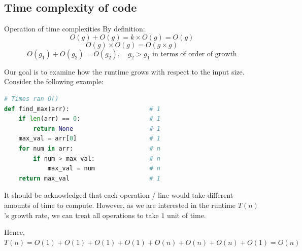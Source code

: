 \subsection{Time complexity of code}

\begin{knBox}
    {Operation of time complexities}
    By definition:
    \[O(g)+O(g)=k\times O(g)=O(g)\]
    \[O(g)\times O(g)=O(g\times g)\]
    \[O(g_1)+O(g_2)=O(g_2),\quad g_2 > g_1\text{ in terms of order of growth}\]
\end{knBox}

Our goal is to examine how the runtime grows with respect to the input size. Consider the following example:

\begin{lstlisting}[language=Python]
                                        # Times ran O()
def find_max(arr):                      # 1
    if len(arr) == 0:                   # 1
        return None                     # 1
    max_val = arr[0]                    # 1
    for num in arr:                     # n
        if num > max_val:               # n
            max_val = num               # n
    return max_val                      # 1
\end{lstlisting}

It should be acknowledged that each operation / line would take different amounts of time to compute. However, as we are interested in the runtime $T(n)$'s growth rate, we can treat all operations to take $1$ unit of time.

Hence, $T(n)=O(1)+O(1)+O(1)+O(1)+O(n)+O(n)+O(n)+O(1)=O(n)$

